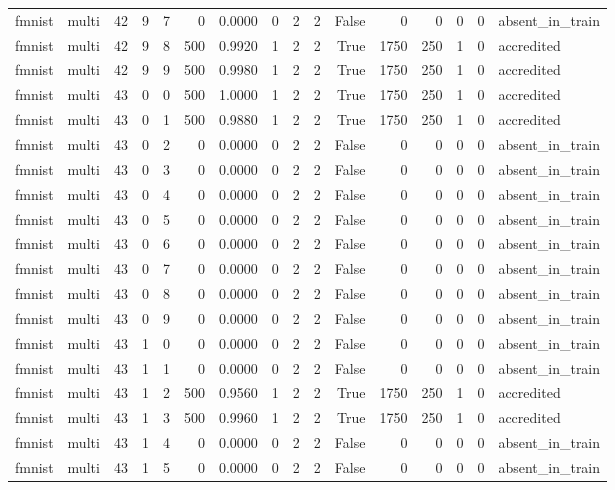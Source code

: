 \begin{tabular}{llrrrrrrrrrrrrrl}
fmnist & multi & 42 & 9 & 7 & 0 & 0.0000 & 0 & 2 & 2 & False & 0 & 0 & 0 & 0 & absent\_in\_train \\
fmnist & multi & 42 & 9 & 8 & 500 & 0.9920 & 1 & 2 & 2 & True & 1750 & 250 & 1 & 0 & accredited \\
fmnist & multi & 42 & 9 & 9 & 500 & 0.9980 & 1 & 2 & 2 & True & 1750 & 250 & 1 & 0 & accredited \\
fmnist & multi & 43 & 0 & 0 & 500 & 1.0000 & 1 & 2 & 2 & True & 1750 & 250 & 1 & 0 & accredited \\
fmnist & multi & 43 & 0 & 1 & 500 & 0.9880 & 1 & 2 & 2 & True & 1750 & 250 & 1 & 0 & accredited \\
fmnist & multi & 43 & 0 & 2 & 0 & 0.0000 & 0 & 2 & 2 & False & 0 & 0 & 0 & 0 & absent\_in\_train \\
fmnist & multi & 43 & 0 & 3 & 0 & 0.0000 & 0 & 2 & 2 & False & 0 & 0 & 0 & 0 & absent\_in\_train \\
fmnist & multi & 43 & 0 & 4 & 0 & 0.0000 & 0 & 2 & 2 & False & 0 & 0 & 0 & 0 & absent\_in\_train \\
fmnist & multi & 43 & 0 & 5 & 0 & 0.0000 & 0 & 2 & 2 & False & 0 & 0 & 0 & 0 & absent\_in\_train \\
fmnist & multi & 43 & 0 & 6 & 0 & 0.0000 & 0 & 2 & 2 & False & 0 & 0 & 0 & 0 & absent\_in\_train \\
fmnist & multi & 43 & 0 & 7 & 0 & 0.0000 & 0 & 2 & 2 & False & 0 & 0 & 0 & 0 & absent\_in\_train \\
fmnist & multi & 43 & 0 & 8 & 0 & 0.0000 & 0 & 2 & 2 & False & 0 & 0 & 0 & 0 & absent\_in\_train \\
fmnist & multi & 43 & 0 & 9 & 0 & 0.0000 & 0 & 2 & 2 & False & 0 & 0 & 0 & 0 & absent\_in\_train \\
fmnist & multi & 43 & 1 & 0 & 0 & 0.0000 & 0 & 2 & 2 & False & 0 & 0 & 0 & 0 & absent\_in\_train \\
fmnist & multi & 43 & 1 & 1 & 0 & 0.0000 & 0 & 2 & 2 & False & 0 & 0 & 0 & 0 & absent\_in\_train \\
fmnist & multi & 43 & 1 & 2 & 500 & 0.9560 & 1 & 2 & 2 & True & 1750 & 250 & 1 & 0 & accredited \\
fmnist & multi & 43 & 1 & 3 & 500 & 0.9960 & 1 & 2 & 2 & True & 1750 & 250 & 1 & 0 & accredited \\
fmnist & multi & 43 & 1 & 4 & 0 & 0.0000 & 0 & 2 & 2 & False & 0 & 0 & 0 & 0 & absent\_in\_train \\
fmnist & multi & 43 & 1 & 5 & 0 & 0.0000 & 0 & 2 & 2 & False & 0 & 0 & 0 & 0 & absent\_in\_train \\

\end{tabular}
